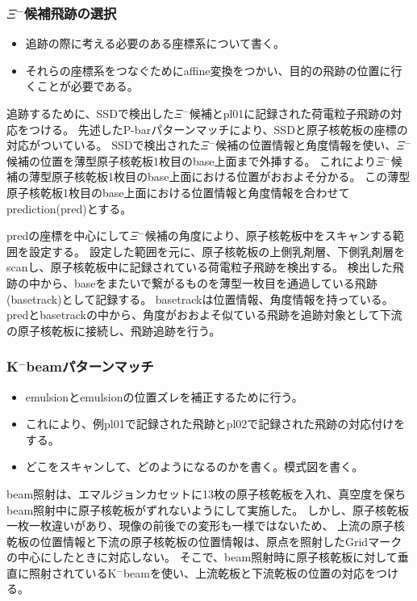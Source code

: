 \documentclass[12pt,a4paper]{jarticle}
\begin{document}
\subsubsection{$\Xi$$^-$候補飛跡の選択}
\begin{itemize}
    \item 追跡の際に考える必要のある座標系について書く。
    \item それらの座標系をつなぐためにaffine変換をつかい、目的の飛跡の位置に行くことが必要である。
\end{itemize}
追跡するために、SSDで検出した$\Xi$$^-$候補とpl01に記録された荷電粒子飛跡の対応をつける。
先述したP-barパターンマッチにより、SSDと原子核乾板の座標の対応がついている。
SSDで検出された$\Xi$$^-$候補の位置情報と角度情報を使い、$\Xi$$^-$候補の位置を薄型原子核乾板1枚目のbase上面まで外挿する。
これにより$\Xi$$^-$候補の薄型原子核乾板1枚目のbase上面における位置がおおよそ分かる。
この薄型原子核乾板1枚目のbase上面における位置情報と角度情報を合わせてprediction(pred)とする。
\par
predの座標を中心にして$\Xi$$^-$候補の角度により、原子核乾板中をスキャンする範囲を設定する。
設定した範囲を元に、原子核乾板の上側乳剤層、下側乳剤層をscanし、原子核乾板中に記録されている荷電粒子飛跡を検出する。
検出した飛跡の中から、baseをまたいで繋がるものを薄型一枚目を通過している飛跡(basetrack)として記録する。
basetrackは位置情報、角度情報を持っている。
predとbasetrackの中から、角度がおおよそ似ている飛跡を追跡対象として下流の原子核乾板に接続し、飛跡追跡を行う。
\subsubsection{K$^-$beamパターンマッチ}
\begin{itemize}
    \item emulsionとemulsionの位置ズレを補正するために行う。
    \item これにより、例pl01で記録された飛跡とpl02で記録された飛跡の対応付けをする。
    \item どこをスキャンして、どのようになるのかを書く。模式図を書く。
\end{itemize}
beam照射は、エマルジョンカセットに13枚の原子核乾板を入れ、真空度を保ちbeam照射中に原子核乾板がずれないようにして実施した。
しかし、原子核乾板一枚一枚違いがあり、現像の前後での変形も一様ではないため、
上流の原子核乾板の位置情報と下流の原子核乾板の位置情報は、原点を照射したGridマークの中心にしたときに対応しない。
そこで、beam照射時に原子核乾板に対して垂直に照射されているK$^-$beamを使い、上流乾板と下流乾板の位置の対応をつける。
\end{document}
